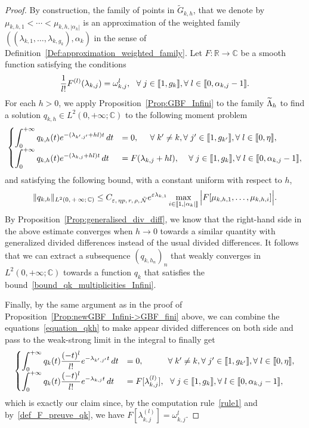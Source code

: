 \documentclass[10pt]{amsart}
\theoremstyle{definition}\newtheorem{defi}[theo]{Definition}\newtheorem{rema}[theo]{Remark}\newtheorem{exam}[theo]{Example}\newtheorem{exem}[theo]{Example}\newtheorem{nota}[theo]{Notation}
\newcommand{\llbracket}{\mathopen{[\mkern -2.7mu[}}
\newcommand{\rrbracket}{\mathclose{]\mkern -2.7mu]}}
\newcommand{\inter}[2]{\llbracket #1,#2 \rrbracket}
\newcommand{\n}{g}
\newcommand{\NN}{\mathcal{N}}
\newcommand{\R}{\mathbb{R}}
\newcommand{\C}{\mathbb{C}}
\let\oldtilde\tilde
\renewcommand*{\tilde}[1]{\mathchoice{\widetilde{#1}}{\widetilde{#1}}{\oldtilde{#1}}{\oldtilde{#1}}}\let\oldexists\exists
\renewcommand*{\exists}{\mathrel{\oldexists}}
\let\oldforall\forall
\renewcommand*{\forall}{\mathrel{\oldforall}}
\begin{document}
\begin{proof}
By construction, the family of points in $\widetilde{G}_{k,h}$, that we denote by $\mu_{k,h,1} < \dotsm < \mu_{k,h,|\alpha_k|}$ is an approximation of the weighted family $((\lambda_{k,1},\dotsc,\lambda_{k,\n_k}), \alpha_k)$ in the sense of Definition~\ref{Def:approximation_weighted_family}. Let $F:\R\to \C$ be a smooth function satisfying the conditions
\begin{equation}\label{def_F_preuve_qk}
\frac{1}{l!} F^{(l)} (\lambda_{k,j}) = \omega_{k,j}^l, \ \ \forall j\in \inter{1}{\n_k}, \forall l\in \inter{0}{\alpha_{k,j}-1}.
\end{equation}
For each $h>0$, we apply Proposition~\ref{Prop:GBF_Infini} to the family $\tilde{\Lambda}_h$ to find a solution $q_{k,h}\in L^2(0,+\infty;\C)$ to the following moment problem
\begin{equation}\label{equation_qkh}
\begin{cases}
\displaystyle\int_0^{+\infty} q_{k,h}(t) e^{-(\lambda_{k',j'} + hl) t} \, dt & = 0, \mkern25mu \forall k'\neq k, \forall j'\in \inter{1}{\n_{k'}}, \forall l\in \inter{0}{\eta},\\[0.15em]
\displaystyle\int_0^{+\infty} q_{k,h}(t) e^{-(\lambda_{k,j}+hl) t} \, dt & = F(\lambda_{k,j}+hl), \quad\, \forall j\in \inter{1}{\n_{k}}, \forall l\in \inter{0}{\alpha_{k,j}-1},
\end{cases}
\end{equation}
and satisfying the following bound, with a constant uniform with respect to $h$,
\[
\|q_{k,h}\|_{L^2(0,\,+\,\infty;\,\C)} \leq C_{\varepsilon,\, \eta p,\,r,\, \rho,\, \tilde{\NN}} e^{\varepsilon \lambda_{k,1}} \max \limits_{i\in \inter{1}{|\alpha_k|}} \Big| F[\mu_{k,h,1}, \dots, \mu_{k,h,i}] \Big|.
\]
By Proposition~\ref{Prop:generalised_div_diff}, we know that the right-hand side in the above estimate converges when $h\to 0$ towards a similar quantity with generalized divided differences instead of the usual divided differences. It follows that we can extract a subsequence $(q_{k,h_n})_n$ that weakly converges in $L^2(0,+\infty;\C)$ towards a function $q_k$ that satisfies the bound~\eqref{bound_qk_multiplicities_Infini}.

Finally, by the same argument as in the proof of Proposition~\ref{Prop:newGBF_Infini->GBF_fini} above, we can combine the equations~\eqref{equation_qkh} to make appear divided differences on both side and pass to the weak-strong limit in the integral to finally get
\begin{equation*}\label{equation_qk}
\begin{cases}
\displaystyle\int_0^{+\infty} q_{k}(t) \frac{(-t)^l}{l!} e^{-\lambda_{k',j'}t} \, dt & = 0, \mkern53mu \forall k'\neq k, \forall j'\in \inter{1}{\n_{k'}}, \forall l\in \inter{0}{\eta},\\[0.15em]
\displaystyle\int_0^{+\infty} q_{k}(t) \frac{(-t)^l}{l!} e^{-\lambda_{k,j}t} \, dt & = F[\lambda_{k,j}^{(l)}], \ \ \forall j\in \inter{1}{\n_{k}}, \forall l\in \inter{0}{\alpha_{k,j}-1},
\end{cases}
\end{equation*}
which is exactly our claim since, by the computation rule~\eqref{rule1} and by~\eqref{def_F_preuve_qk}, we have $F[\lambda_{k,j}^{(l)}] = \omega_{k,j}^l$.
\end{proof}
\end{document}
